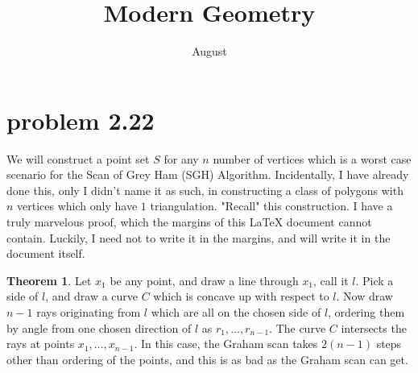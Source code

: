 \documentclass[12pt]{article}
\title{Modern Geometry}
\author{August}
\theoremstyle{definition}
\newtheorem{theorem}{Theorem}
\begin{document}
\maketitle

\section{problem 2.22}

We will construct a point set $S$ for any $n$ number of vertices which is a worst case scenario for the Scan of Grey Ham (SGH) Algorithm. Incidentally, I have already done this, only I didn't name it as such, in constructing a class of polygons with $n$ vertices which only have $1$ triangulation. "Recall" this construction. I have a truly marvelous proof, which the margins of this LaTeX document cannot contain. Luckily, I need not to write it in the margins, and will write it in the document itself. 

\begin{theorem}
Let $x_1$ be any point, and draw a line through $x_1$, call it $l$. Pick a side of $l$, and draw a curve $C$ which is concave up with respect to $l$. Now draw $n-1$ rays originating from $l$ which are all on the chosen side of $l$, ordering them by angle from one chosen direction of $l$ as $r_1,\dots, r_{n-1}$. The curve $C$ intersects the rays at points $x_1,\dots, x_{n-1}$. In this case, the Graham scan takes $2(n-1)$ steps other than ordering of the points, and this is as bad as the Graham scan can get. 
\end{theorem}
\end{document}
